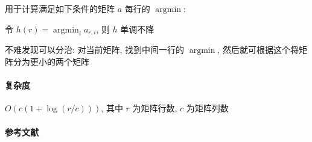 用于计算满足如下条件的矩阵 \(a\) 每行的 \(\operatorname{argmin}\):

\begin{center}
令 \(h(r) = \operatorname{argmin}_i a_{r,i}\), 则 \(h\) 单调不降
\end{center}

不难发现可以分治: 对当前矩阵, 找到中间一行的 \(\operatorname{argmin}\), 然后就可根据这个将矩阵分为更小的两个矩阵

\paragraph{复杂度} \(O(c(1+\log(r/c)))\), 其中 \(r\) 为矩阵行数, \(c\) 为矩阵列数

\paragraph{参考文献}

\cite{enwiki:1033199110}
